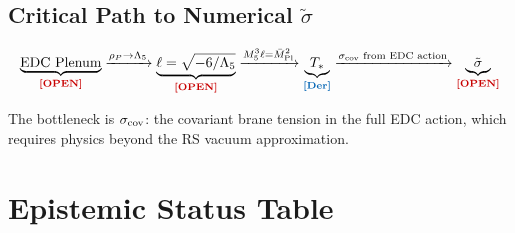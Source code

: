 \documentclass[11pt,a4paper]{article}
\newcommand{\tagDer}{\textcolor{derivedblue}{\textbf{[Der]}}}
\newcommand{\tagOPEN}{\textcolor{openred}{\textbf{[OPEN]}}}
\theoremstyle{definition}
\theoremstyle{remark}
\begin{document}
\subsection{Critical Path to Numerical $\tilde\sigma$}

\begin{equation}
\underbrace{\text{EDC Plenum}}_{\tagOPEN}
\xrightarrow{\rho_P \to \Lambda_5}
\underbrace{\ell = \sqrt{-6/\Lambda_5}}_{\tagOPEN}
\xrightarrow{M_5^3\ell = \bar{M}_{\rm Pl}^2}
\underbrace{T_*}_{\tagDer}
\xrightarrow{\sigma_{\rm cov}\text{ from EDC action}}
\underbrace{\tilde\sigma}_{\tagOPEN}
\end{equation}

The bottleneck is $\sigma_{\rm cov}$: the covariant brane tension in the
full EDC action, which requires physics beyond the RS vacuum approximation.

\section{Epistemic Status Table}
\label{sec:epistemic}
\end{document}
